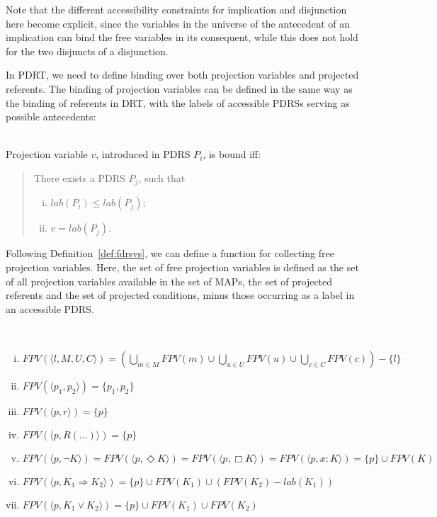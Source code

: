 \noindent Note that the different accessibility constraints for implication
and disjunction here become explicit, since the variables in the universe of
the antecedent of an implication can bind the free variables in its
consequent, while this does not hold for the two disjuncts of a disjunction.

In PDRT, we need to define binding over both projection variables and
projected referents. The binding of projection variables can be defined in
the same way as the binding of referents in DRT, with the labels of
accessible PDRSs serving as possible antecedents:

\begin{definition}~\\
Projection variable $v$, introduced in PDRS $P_i$, is bound iff:
\begin{quote}
There exists a PDRS $P_j$, such that
\begin{enumerate}[i.]
  \item $lab(P_i) \leq lab(P_j)$; 
  \item $v = lab(P_j)$.
\end{enumerate}
\end{quote}
\end{definition}

\noindent Following Definition~\ref{def:fdrsvs}, we can define a function
for collecting free projection variables. Here, the set of free projection
variables is defined as the set of all projection variables available in the
set of MAPs, the set of projected referents and the set of projected
conditions, minus those occurring as a label in an accessible PDRS.

\begin{definition}~
  \begin{enumerate}[i.]
    \item $FPV(\langle l, M, U, C \rangle) 
      = (\bigcup_{m\in M} FPV(m) \cup \bigcup_{u\in U} FPV(u) 
      \cup \bigcup_{c\in C} FPV(c)) - \{l\}$
    \item $FPV(\langle p_1, p_2\rangle) = \{p_1, p_2\}$
    \item $FPV(\langle p, r\rangle) = \{p\}$
    \item $FPV(\langle p, R(...)\rangle) = \{p\}$
    \item $FPV(\langle p,\neg K\rangle) = FPV(\langle p,\Diamond K\rangle)
      = FPV(\langle p,\Box K\rangle) = FPV(\langle p,x:K\rangle) 
      = \{p\} \cup FPV(K)$
    \item $FPV(\langle p,K_1 \Rightarrow K_2\rangle) 
      = \{p\}\cup FPV(K_1) \cup (FPV(K_2) - lab(K_1))$
    \item $FPV(\langle p,K_1 \vee K_2\rangle) 
      = \{p\}\cup FPV(K_1) \cup FPV(K_2)$
  \end{enumerate}
\end{definition}

